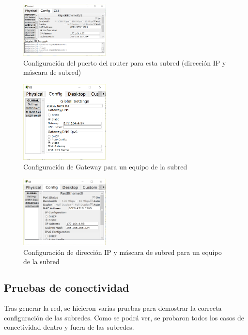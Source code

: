 \documentclass[../main.tex]{subfiles}
\begin{document}
\begin{figure}[H]
  \centering
  \includegraphics[width=0.4\textwidth]{images/3-port.PNG}
  \caption{Configuración del puerto del router para esta subred (dirección IP y máscara de subred)}\label{fig:ej31}
\end{figure}

\begin{figure}[H]
  \centering
  \includegraphics[width=0.4\textwidth]{images/3-g.PNG}
  \caption{Configuración de Gateway para un equipo de la subred}\label{fig:ej32}
\end{figure}

\begin{figure}[H]
  \centering
  \includegraphics[width=0.4\textwidth]{images/3-ip.PNG}
  \caption{Configuración de dirección IP y máscara de subred para un equipo de la subred}\label{fig:ej33}
\end{figure}

\subsection*{Pruebas de conectividad}
Tras generar la red, se hicieron varias pruebas para demostrar la correcta configuración de las subredes. Como se podrá ver, se probaron todos los casos de conectividad dentro y fuera de las subredes.
\end{document}
